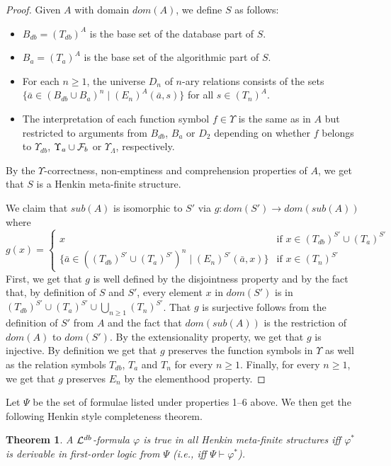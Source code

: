 \documentclass[preprint,11pt]{elsarticle}
\newtheorem{theorem}{Theorem}[section]
\theoremstyle{definition}
\theoremstyle{remark}
\begin{document}
\begin{proof}
Given $A$ with domain $\mathit{dom}(A)$, we define $S$ as follows:
\begin{itemize}
\item $B_{db} = (T_{db})^A$ is the base set of the database part of $S$.
\item $B_a = (T_a)^A$ is the base set of the algorithmic part of $S$.
\item For each $n \geq 1$, the universe $D_n$ of $n$-ary relations consists of the sets $\{\bar{a} \in (B_{db} \cup B_a)^n \mid (E_n)^A(\bar{a}, s)\}$ for all $s \in (T_n)^A$. 
\item The interpretation of each function symbol $f \in \Upsilon$ is the same as in $A$ but restricted to arguments from $B_{db}$, $B_a$ or $D_2$ depending on whether $f$ belongs to $\Upsilon_{db}$, $\Upsilon_a \cup {\cal F}_b$ or $\Upsilon_\Lambda$, respectively.
\end{itemize}    
By the $\Upsilon$-correctness, non-emptiness and comprehension properties of $A$, we get that $S$ is a Henkin meta-finite structure. 

We claim that $\mathit{sub}(A)$ is isomorphic to $S'$ via $g: \mathit{dom}(S') \rightarrow \mathit{dom}(\mathit{sub}(A))$ where 
\[g(x) = \begin{cases} x & \text{if } x \in (T_{db})^{S'} \cup (T_{a})^{S'}\\
\{\bar{a} \in ((T_{db})^{S'} \cup (T_a)^{S'})^n \mid (E_n)^{S'}(\bar{a}, x)\} & \text{if } x \in (T_n)^{S'}\end{cases}\]
First, we get that $g$ is well defined by the disjointness property and by the fact that, by definition of $S$ and $S'$, every element $x$ in $\mathit{dom}(S')$ is in $(T_{db})^{S'} \cup (T_{a})^{S'} \cup \bigcup_{n \geq 1} (T_n)^{S'}$. That $g$ is surjective follows from the definition of $S'$ from $A$ and the fact that $\mathit{dom}(\mathit{sub}(A))$ is the restriction of $\mathit{dom}(A)$ to $\mathit{dom}(S')$. By the extensionality property, we get that $g$ is injective. By definition we get that $g$ preserves the function symbols in $\Upsilon$ as well as the relation symbols $T_{db}$, $T_a$ and $T_n$ for every $n \geq 1$. Finally, for every $n \geq 1$, we get that $g$ preserves $E_n$ by the elementhood property.  
\end{proof}

Let $\Psi$ be the set of formulae listed under properties 1--6 above. We then get the following Henkin style completeness theorem.

\begin{theorem}\label{HenkinCompleteness}
A ${\cal L}^{db}$-formula $\varphi$ is true in all Henkin meta-finite structures iff $\varphi^*$ is derivable in first-order logic from $\Psi$ (i.e., iff $\Psi \vdash \varphi^*$).
\end{theorem}
\end{document}
